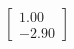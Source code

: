 \documentclass[preview]{standalone}
\begin{document}
\begin{align*}
\begin{bmatrix} 1.00 \\ -2.90 \end{bmatrix}
\end{align*}
\end{document}
